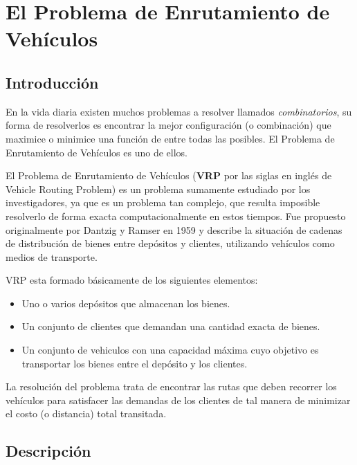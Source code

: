 \chapter{El Problema de Enrutamiento de Vehículos} \label{chap:vrp}

\section{Introducción} \label{sect:introduccion}

En la vida diaria existen muchos problemas a resolver llamados \emph{combinatorios}, su forma de resolverlos es encontrar la mejor configuración (o combinación) que maximice o minimice una función de entre todas las posibles. El Problema de Enrutamiento de Vehículos es uno de ellos. 

El Problema de Enrutamiento de Vehículos (\textbf{VRP} por las siglas en inglés de Vehicle Routing Problem) es un problema sumamente estudiado por los investigadores, ya que es un problema tan complejo, que resulta imposible resolverlo de forma exacta computacionalmente en estos tiempos. Fue propuesto originalmente por Dantzig y Ramser en 1959 \cite{primervrp} y describe la situación de cadenas de distribución de bienes entre depósitos y clientes, utilizando vehículos como medios de transporte.

VRP esta formado básicamente de los siguientes elementos:
\begin{itemize}
	
	\item Uno o varios depósitos que almacenan los bienes.
	\item Un conjunto de clientes que demandan una cantidad exacta de bienes.
	\item Un conjunto de vehiculos con una capacidad máxima cuyo objetivo es transportar los bienes entre el depósito y los clientes.

\end{itemize}

La resolución del problema trata de encontrar las rutas que deben recorrer los vehículos para satisfacer las demandas de los clientes de tal manera de minimizar el costo (o distancia) total transitada.

\section{Descripción} \label{sect:descripcion}

























